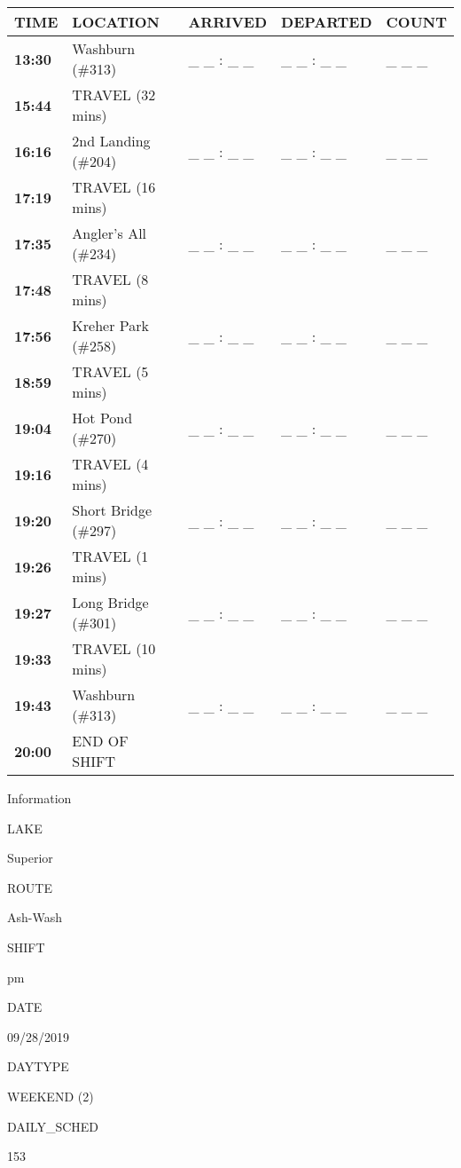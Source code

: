 \documentclass[]{article}
\begin{document}
\begin{tabular}{>{\bfseries}lllll}
\toprule
\textbf{TIME} & \textbf{LOCATION} & \textbf{ARRIVED} & \textbf{DEPARTED} & \textbf{COUNT}\\
\midrule
13:30 & Washburn (\#313) & \_ \_ : \_ \_ & \_ \_ : \_ \_ & \_ \_ \_\\
15:44 & TRAVEL (32 mins) &  &  & \\
16:16 & 2nd Landing (\#204) & \_ \_ : \_ \_ & \_ \_ : \_ \_ & \_ \_ \_\\
17:19 & TRAVEL (16 mins) &  &  & \\
17:35 & Angler's All (\#234) & \_ \_ : \_ \_ & \_ \_ : \_ \_ & \_ \_ \_\\
17:48 & TRAVEL (8 mins) &  &  & \\
17:56 & Kreher Park (\#258) & \_ \_ : \_ \_ & \_ \_ : \_ \_ & \_ \_ \_\\
18:59 & TRAVEL (5 mins) &  &  & \\
19:04 & Hot Pond (\#270) & \_ \_ : \_ \_ & \_ \_ : \_ \_ & \_ \_ \_\\
19:16 & TRAVEL (4 mins) &  &  & \\
19:20 & Short Bridge (\#297) & \_ \_ : \_ \_ & \_ \_ : \_ \_ & \_ \_ \_\\
19:26 & TRAVEL (1 mins) &  &  & \\
19:27 & Long Bridge (\#301) & \_ \_ : \_ \_ & \_ \_ : \_ \_ & \_ \_ \_\\
19:33 & TRAVEL (10 mins) &  &  & \\
19:43 & Washburn (\#313) & \_ \_ : \_ \_ & \_ \_ : \_ \_ & \_ \_ \_\\
20:00 & END OF SHIFT &  &  & \\
\bottomrule
\end{tabular}\newpage

Information

LAKE

Superior

ROUTE

Ash-Wash

SHIFT

pm

DATE

09/28/2019

DAYTYPE

WEEKEND (2)

DAILY\_SCHED

153

\vspace{24pt}
\end{document}
